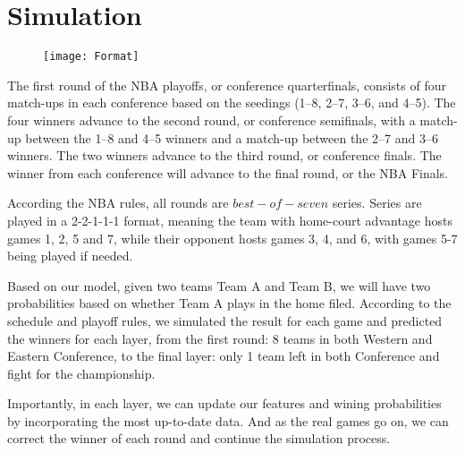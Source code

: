 \section{Simulation}

\begin{figure}[h]
\centering
\texttt{[image: Format]}
\end{figure}

The first round of the NBA playoffs, or conference quarterfinals, consists of 
four match-ups in each conference based on the seedings (1–8, 2–7, 3–6, and 4–5).
The four winners advance to the second round, or conference semifinals, with a 
match-up between the 1–8 and 4–5 winners and a match-up between the 2–7 and 3–6
winners. The two winners advance to the third round, or conference finals.
The winner from each conference will advance to the final round, or the NBA Finals.

According the NBA rules, all rounds are $best-of-seven$ series. Series are played
in a 2-2-1-1-1 format, meaning the team with home-court advantage hosts games
1, 2, 5 and 7, while their opponent hosts games 3, 4, and 6, with games 5-7 
being played if needed.

Based on our model, given two teams Team A and Team B, we will have two
probabilities based on whether Team A plays in the home filed.
According to the schedule and playoff rules, we simulated the result for 
each game and predicted the winners for each layer, from the first round:
8 teams in both Western and Eastern Conference, to the final layer: 
only 1 team left in both Conference and fight for the championship. 

Importantly, in each layer, we can update our features and wining probabilities
by incorporating the most up-to-date data. And as the real games go on, we can
correct the winner of each round and continue the simulation process. 


